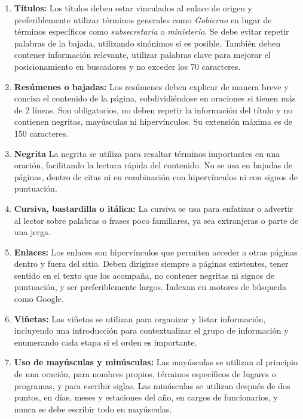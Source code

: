 \documentclass[12pt]{article}
\begin{document}
            \begin{enumerate}
                \item \textbf{Títulos:} Los títulos deben estar vinculados al enlace de origen y preferiblemente utilizar términos generales como \emph{Gobierno} en lugar de términos específicos como \emph{subsecretaría} o \emph{ministerio}. Se debe evitar repetir palabras de la bajada, utilizando sinónimos si es posible. También deben contener información relevante, utilizar palabras clave para mejorar el posicionamiento en buscadores y no exceder los 70 caracteres.
                \item \textbf{Resúmenes o bajadas:} Los resúmenes deben explicar de manera breve y concisa el contenido de la página, subdividiéndose en oraciones si tienen más de 2 líneas. Son obligatorios, no deben repetir la información del título y no contienen negritas, mayúsculas ni hipervínculos. Su extensión máxima es de 150 caracteres.
                \item \textbf{Negrita} La negrita se utiliza para resaltar términos importantes en una oración, facilitando la lectura rápida del contenido. No se usa en bajadas de páginas, dentro de citas ni en combinación con hipervínculos ni con signos de puntuación.
                \item \textbf{Cursiva, bastardilla o itálica:} La cursiva se usa para enfatizar o advertir al lector sobre palabras o frases poco familiares, ya sea extranjeras o parte de una jerga.
                \item \textbf{Enlaces:} Los enlaces son hipervínculos que permiten acceder a otras páginas dentro y fuera del sitio. Deben dirigirse siempre a páginas existentes, tener sentido en el texto que los acompaña, no contener negritas ni signos de puntuación, y ser preferiblemente largos. Indexan en motores de búsqueda como Google.
                \item \textbf{Viñetas:}  Las viñetas se utilizan para organizar y listar información, incluyendo una introducción para contextualizar el grupo de información y enumerando cada etapa si el orden es importante.
                \item \textbf{Uso de mayúsculas y minúsculas:} Las mayúsculas se utilizan al principio de una oración, para nombres propios, términos específicos de lugares o programas, y para escribir siglas. Las minúsculas se utilizan después de dos puntos, en días, meses y estaciones del año, en cargos de funcionarios, y nunca se debe escribir todo en mayúsculas.
            \end{enumerate}
        
\end{document}
